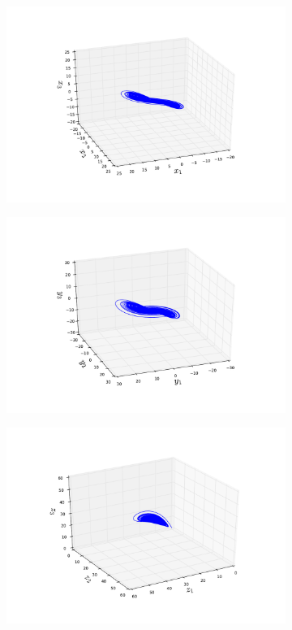 \begin{figure}
	\centering
	\begin{subfigure}{0.30\textwidth}
		\centering
		\includegraphics[width=\linewidth]{figures/shadow_manifold_x.pdf}
	\end{subfigure}
	\begin{subfigure}{0.30\textwidth}
		\centering
		\includegraphics[width=\linewidth]{figures/shadow_manifold_y.pdf}
	\end{subfigure}
	\begin{subfigure}{0.30\textwidth}
		\centering
		\includegraphics[width=\linewidth]{figures/shadow_manifold_z.pdf}

\end{subfigure}
\end{figure}
